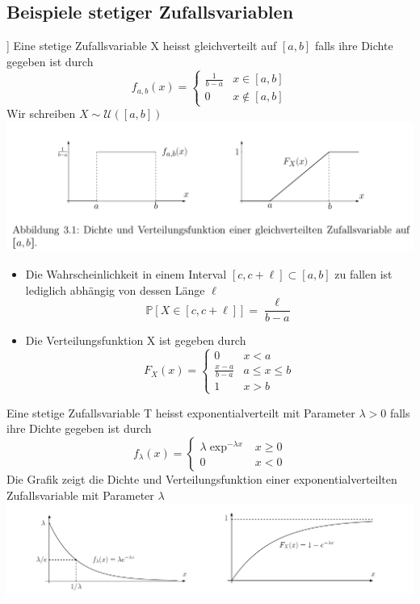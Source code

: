 \subsection{Beispiele stetiger Zufallsvariablen}
\Def[3.27 Gleichverteilung auf [a,b]] \newline
Eine stetige Zufallsvariable X heisst gleichverteilt auf \([a,b]\) falls ihre Dichte gegeben ist durch \[ f_{a,b}(x) = \begin{cases}
    \frac{1}{b-a} & x \in [a,b] \\
    0 & x \notin [a,b]
\end{cases}\]
Wir schreiben \(X \sim \mathcal{U}([a,b])\) \newline
\includegraphics[scale=0.1]{Gleichverteilt.png}
\Bem[3.27A]
\begin{itemize}
    \item Die Wahrscheinlichkeit in einem Interval \( [c, c + \ell] \subset [a,b]\) zu fallen ist lediglich abhängig von dessen Länge \( \ell\) \[\mathbb{P}[X \in [c, c + \ell ]] = \frac{\ell}{b-a}\]
    \item Die Verteilungsfunktion X ist gegeben durch \[ F_X(x) = \begin{cases}
        0 & x < a \\
        \frac{x-a}{b-a} & a \leq x \leq b \\
        1 & x > b
    \end{cases}\]
\end{itemize}
 \newline
Eine stetige Zufallsvariable T heisst exponentialverteilt mit Parameter \( \lambda > 0\) falls ihre Dichte gegeben ist durch
\[ f_\lambda(x) = \begin{cases}
    \lambda \exp ^{-\lambda x } & x \geq 0 \\
    0 & x < 0
\end{cases}\]
\Bem[3.28A]
Die Grafik zeigt die Dichte und Verteilungsfunktion einer exponentialverteilten Zufallsvariable mit Parameter \( \lambda\)
\includegraphics[scale=0.2]{exp_Dichte_Verteilung.png} \\ 
